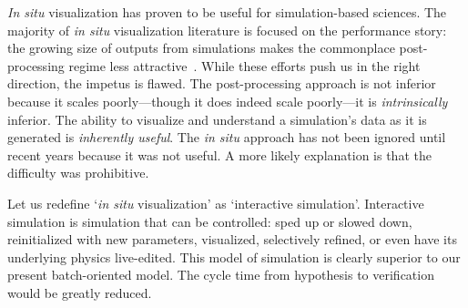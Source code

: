 
\textit{In situ} visualization has proven to be useful for
simulation-based sciences.  The majority of \textit{in situ}
visualization literature is focused on the performance story: the
growing size of outputs from simulations makes the commonplace
post-processing regime less attractive~\cite{Dorier:2013:Damaris,
Fabian:2011:Catalyst, Whitlock:2011:Libsim}.  While these efforts push
us in the right direction, the impetus is flawed.  The post-processing
approach is not inferior because it scales poorly---though it does
indeed scale poorly---it is
\emph{intrinsically} inferior.  The ability to visualize and understand
a simulation's data as it is generated is \emph{inherently useful}.
The
\textit{in situ} approach has not been ignored until recent years
because it was not useful.  A more likely explanation is that the
difficulty was prohibitive.

Let us redefine `\textit{in situ} visualization' as `interactive
simulation'.  Interactive simulation is simulation that can be
controlled: sped up or slowed down, reinitialized with new parameters,
visualized, selectively refined, or even have its underlying physics
live-edited.  This model of simulation is clearly superior to our
present batch-oriented model.  The cycle time from hypothesis to
verification would be greatly reduced.





